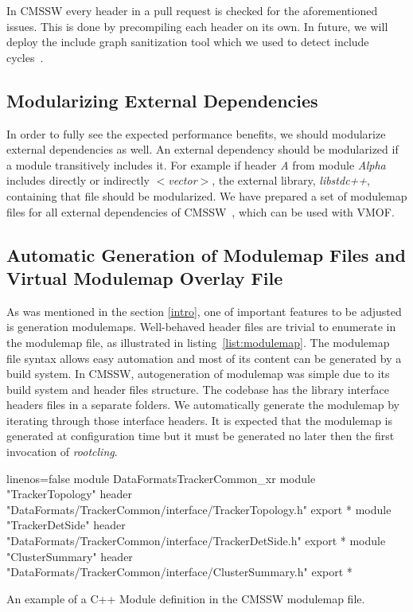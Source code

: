 \documentclass[12pt]{iopart}
\begin{document}
In CMSSW every header in a pull request is checked for the aforementioned issues. This is done by precompiling each header on its own. In future, we will deploy the include graph sanitization tool which we used to detect include cycles~\cite{scram-cycle-break}.

\subsection{Modularizing External Dependencies}

In order to fully see the expected performance benefits, we should modularize external dependencies as well. An external dependency should be modularized if a module transitively includes it. For example if header \textit{A} from module \textit{Alpha} includes directly or indirectly \textit{$<$vector$>$}, the external library, \textit{libstdc++}, containing that file should be modularized. We have prepared a set of modulemap files for all external dependencies of CMSSW~\cite{raphael-auto-Modules}, which can be used with VMOF.

\subsection{Automatic Generation of Modulemap Files and Virtual Modulemap Overlay File}
\label{autogen}

As was mentioned in the section \ref{intro}, one of important features to be adjusted is generation modulemaps. Well-behaved header files are trivial to enumerate in the modulemap file, as illustrated in listing~\ref{list:modulemap}. The modulemap file syntax allows easy automation and most of its content can be generated by a build system. In CMSSW, autogeneration of modulemap was simple due to its build system and header files structure. The codebase has the library interface headers files in a separate folders. We automatically generate the modulemap by iterating through those interface headers. It is expected that the modulemap is generated at configuration time but it must be generated no later then the first invocation of \textit{rootcling}.

\begin{listing}[h]
\noindent
\begin{minipage}[h]{\textwidth}
\begin{cppcode*}{linenos=false}
module DataFormatsTrackerCommon_xr {
  module "TrackerTopology" {header "DataFormats/TrackerCommon/interface/TrackerTopology.h" export *}
  module "TrackerDetSide" {header "DataFormats/TrackerCommon/interface/TrackerDetSide.h" export *}
  module "ClusterSummary" {header "DataFormats/TrackerCommon/interface/ClusterSummary.h" export *}}
\end{cppcode*}
\end{minipage}
\caption{An example of a C++ Module definition in the CMSSW modulemap file.}
\label{list:modulemap}
\end{listing}
  
\end{document}
